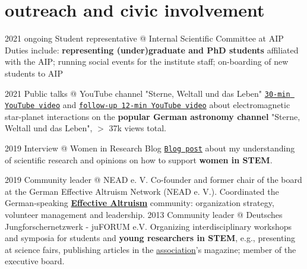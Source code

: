 \documentclass[9.5pt]{k-cv} %
\begin{document}
\section{outreach and civic involvement}
\begin{entrylist}
\entry
{2021 \to ongoing}
{Student representative @ Internal Scientific Committee at AIP}
{}
{Duties include: \textbf{representing (under)graduate and PhD students} affiliated with the AIP; running social events for the institute staff; on-boarding of new students to AIP}

\entry
{2021}
{Public talks @ YouTube channel "Sterne, Weltall und das Leben"}
{}
{\texttt{\href{https://www.youtube.com/watch?v=LLHLobUifeY}{30-min YouTube video}} and \texttt{\href{https://www.youtube.com/watch?v=YRw_tIpspRw}{follow-up 12-min YouTube video}} about electromagnetic star-planet interactions on the \textbf{popular German astronomy channel} "Sterne, Weltall und das Leben", $>$ 37k views total.}

\entry
{2019}
{Interview @ Women in Research Blog}
{}
{\texttt{\href{https://womeninresearchblog.wordpress.com/2019/06/26/ekaterina-germany/}{Blog post}} about my understanding of scientific research and opinions on how to support \textbf{women in STEM}.}

\entry
{2019 }
{Community leader @ NEAD e. V.}
{}
{Co-founder and former chair of the board at the German Effective Altruism Network (NEAD e. V.). Coordinated the German-speaking \href{https://www.effectivealtruism.com/}{\textbf{Effective Altruism}} community: organization strategy, volunteer management and leadership. }
\entry
{2013 }
{Community leader @ Deutsches Jungforschernetzwerk - juFORUM e.V.}
{}
{Organizing interdisciplinary workshops and symposia for students and \textbf{young researchers in STEM}, e.g., presenting at science fairs, publishing articles in the \href{https://www.juforum.de/}{association}'s magazine; member of the executive board.}
\end{entrylist}
\end{document}
